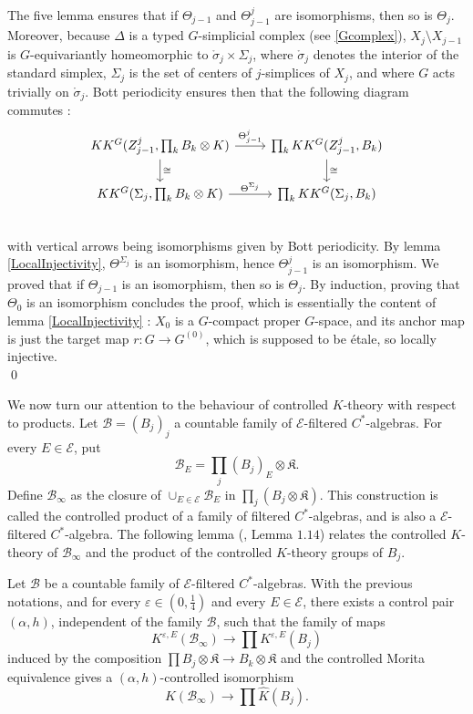 \begin{dem}
The five lemma ensures that if $\Theta_{j-1}$ and $\Theta^j_{j-1}$ are isomorphisms, then so is $\Theta_j$. Moreover, because $\Delta$ is a typed $G$-simplicial complex (see \ref{Gcomplex}), $X_j\setminus X_{j-1}$ is $G$-equivariantly homeomorphic to $\mathring \sigma_j \times \Sigma_j$, where  $\mathring \sigma _j $ denotes the interior of the standard simplex, $\Sigma_j$ is the set of centers of $j$-simplices of $X_j$, and where $G$ acts trivially on $\mathring \sigma _j$. Bott periodicity ensures then that the following diagram commutes :
\[\begin{tikzcd}
KK^G(Z_{j-1}^j,\prod_k B_k\otimes K) \arrow{r}{\Theta_{j-1}^j}\arrow{d}{\cong} & \prod_k KK^G(Z_{j-1}^j,B_k) \arrow{d}{\cong}\\
KK^G(\Sigma_j,\prod_k B_k\otimes K) \arrow{r}{\Theta^{\Sigma_j}} & \prod_k KK^G(\Sigma_j ,B_k)\\ 
\end{tikzcd}\]
with vertical arrows being isomorphisms given by Bott periodicity. By lemma \ref{LocalInjectivity}, $\Theta^{\Sigma_j}$ is an isomorphism, hence $\Theta_{j-1}^j$ is an isomorphism. We proved that if $\Theta_{j-1}$ is an isomorphism, then so is $\Theta_j$. By induction, proving that $\Theta_0$ is an isomorphism concludes the proof, which is essentially the content of lemma \ref{LocalInjectivity} : $X_0$ is a $G$-compact proper $G$-space, and its anchor map is just the target map $r:G\rightarrow G^{(0)}$, which is supposed to be étale, so locally injective.\\
\qed
\end{dem}


We now turn our attention to the behaviour of controlled $K$-theory with respect to products. Let $\mathcal B = (B_j)_j$ a countable family of $\mathcal E$-filtered $C^*$-algebras. For every $E\in\mathcal E$, put 
\[\mathcal B_E = \prod_{j} (B_j)_E\otimes \mathfrak K.\]
Define $\mathcal B_\infty$ as the closure of $\cup_{E\in\mathcal E}\mathcal B_E$ in $\prod_j (B_j\otimes \mathfrak K)$. This construction is called the controlled product of a family of filtered $C^*$-algebras, and is also a $\mathcal E$-filtered $C^*$-algebra. The following lemma (\cite{OY3}, Lemma $1.14$) relates the controlled $K$-theory of $\mathcal B_\infty$ and the product of the controlled $K$-theory groups of $B_j$.\\

\begin{lem}[\cite{OY3}] Let $\mathcal B$ be a countable family of $\mathcal E$-filtered $C^*$-algebras. With the previous notations, and for every $\varepsilon\in(0,\frac{1}{4})$ and every $E\in\mathcal E$, there exists a control pair $(\alpha, h)$, independent of the family $\mathcal B$, such that the family of  maps 
\[K^{\varepsilon,E}(\mathcal B_\infty)\rightarrow \prod K^{\varepsilon,E}(B_j)\]
induced by the composition $\prod B_j\otimes \mathfrak K\rightarrow B_k\otimes \mathfrak K$ and the controlled Morita equivalence gives a $(\alpha,h)$-controlled isomorphism
\[\hat K(\mathcal B_\infty)\rightarrow \prod \hat K(B_j).\]
\end{lem}


